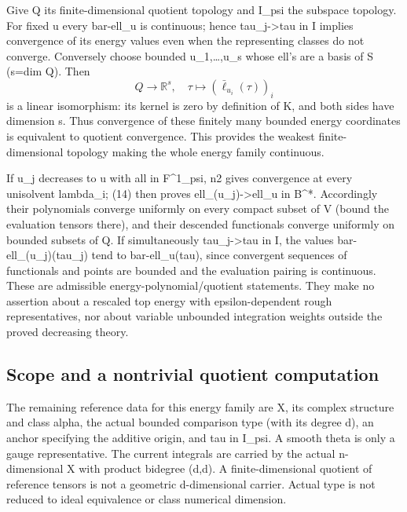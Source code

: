 \documentclass[
]{article}
\begin{document}
Give Q its finite-dimensional quotient topology and I\_psi the subspace
topology. For fixed u every bar-ell\_u is continuous; hence
tau\_j-\textgreater tau in I implies convergence of its energy values
even when the representing classes do not converge. Conversely choose
bounded u\_1,\ldots,u\_s whose ell's are a basis of S (s=dim Q). Then \[
Q\longrightarrow\mathbb{R}^s,\quad
\tau\longmapsto(\bar\ell_{u_i}(\tau))_i
\] is a linear isomorphism: its kernel is zero by definition of K, and
both sides have dimension s. Thus convergence of these finitely many
bounded energy coordinates is equivalent to quotient convergence. This
provides the weakest finite-dimensional topology making the whole energy
family continuous.

If u\_j decreases to u with all in F\^{}1\_psi, n2 gives convergence at
every unisolvent lambda\_i; (14) then proves
ell\_(u\_j)-\textgreater ell\_u in B\^{}*. Accordingly their polynomials
converge uniformly on every compact subset of V (bound the evaluation
tensors there), and their descended functionals converge uniformly on
bounded subsets of Q. If simultaneously tau\_j-\textgreater tau in I,
the values bar-ell\_(u\_j)(tau\_j) tend to bar-ell\_u(tau), since
convergent sequences of functionals and points are bounded and the
evaluation pairing is continuous. These are admissible
energy-polynomial/quotient statements. They make no assertion about a
rescaled top energy with epsilon-dependent rough representatives, nor
about variable unbounded integration weights outside the proved
decreasing theory.

\subsection{Scope and a nontrivial quotient
computation}\label{scope-and-a-nontrivial-quotient-computation}

The remaining reference data for this energy family are X, its complex
structure and class alpha, the actual bounded comparison type (with its
degree d), an anchor specifying the additive origin, and tau in I\_psi.
A smooth theta is only a gauge representative. The current integrals are
carried by the actual n-dimensional X with product bidegree (d,d). A
finite-dimensional quotient of reference tensors is not a geometric
d-dimensional carrier. Actual type is not reduced to ideal equivalence
or class numerical dimension.
\end{document}
